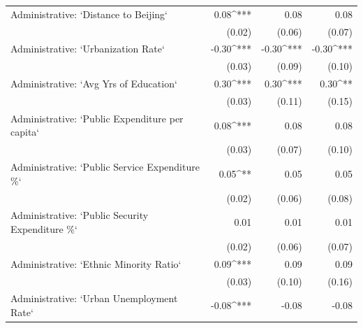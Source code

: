 \begin{table}
\begin{center}
\begin{tabular}{l D{.}{.}{6.5} D{.}{.}{6.5} D{.}{.}{6.5}}
Administrative: `Distance to Beijing`                       & 0.08^{***}              & 0.08                    & 0.08                    \\
                                                            & (0.02)                  & (0.06)                  & (0.07)                  \\
Administrative: `Urbanization Rate`                         & -0.30^{***}             & -0.30^{***}             & -0.30^{***}             \\
                                                            & (0.03)                  & (0.09)                  & (0.10)                  \\
Administrative: `Avg Yrs of Education`                      & 0.30^{***}              & 0.30^{***}              & 0.30^{**}               \\
                                                            & (0.03)                  & (0.11)                  & (0.15)                  \\
Administrative: `Public Expenditure per capita`             & 0.08^{***}              & 0.08                    & 0.08                    \\
                                                            & (0.03)                  & (0.07)                  & (0.10)                  \\
Administrative: `Public Service Expenditure \%`             & 0.05^{**}               & 0.05                    & 0.05                    \\
                                                            & (0.02)                  & (0.06)                  & (0.08)                  \\
Administrative: `Public Security Expenditure \%`            & 0.01                    & 0.01                    & 0.01                    \\
                                                            & (0.02)                  & (0.06)                  & (0.07)                  \\
Administrative: `Ethnic Minority Ratio`                     & 0.09^{***}              & 0.09                    & 0.09                    \\
                                                            & (0.03)                  & (0.10)                  & (0.16)                  \\
Administrative: `Urban Unemployment Rate`                   & -0.08^{***}             & -0.08                   & -0.08                   \\

\end{tabular}
\end{center}
\end{table}
